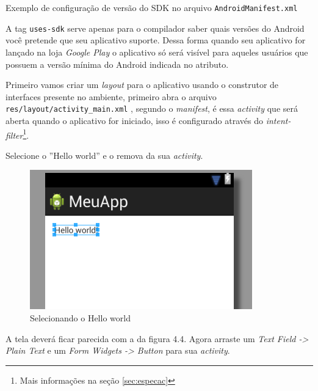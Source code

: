 \documentclass[a4paper,12pt,brazil]{book}
\begin{document}
\begin{singlespace}
\begin{listing}[H]
\inputminted[linenos=true,fontsize=\small,frame=lines, framesep=2mm, tabsize=2,numbersep=5pt]{xml}{src/firstapp/sdk-manifest.xml}
\label{AndroidManifest.sdk}
\caption{Exemplo de configuração de versão do SDK no arquivo \texttt{AndroidManifest.xml} }
\end{listing}

A tag \texttt{uses-sdk} serve apenas para o compilador saber quais versões do Android você pretende que seu aplicativo suporte. Dessa forma quando seu aplicativo for lançado na loja \emph{Google Play} o aplicativo só será visível para aqueles usuários que possuem a versão mínima do Android indicada no atributo.

Primeiro vamos criar um \emph{layout} para o aplicativo usando o construtor de interfaces presente no ambiente, primeiro abra o arquivo \texttt{res/layout/activity\_main.xml} , segundo o \emph{manifest}, é essa \emph{activity} que será aberta quando o aplicativo for iniciado, isso é configurado através do \emph{intent-filter}\footnote{Mais informações na seção \ref{sec:especac}}. 

Selecione o ''Hello world'' e o remova da sua \emph{activity}.

\begin{figure}[H]
  \centering
  \includegraphics{figuras/3-criando-app.png}
  \caption{Selecionando o Hello world}
  \label{fig:b}
\end{figure}

A tela deverá ficar parecida com a da figura 4.4. Agora arraste um \textit{Text Field -> Plain Text} e um \textit{Form Widgets -> Button} para sua \emph{activity}.


\end{singlespace}
\end{document}
